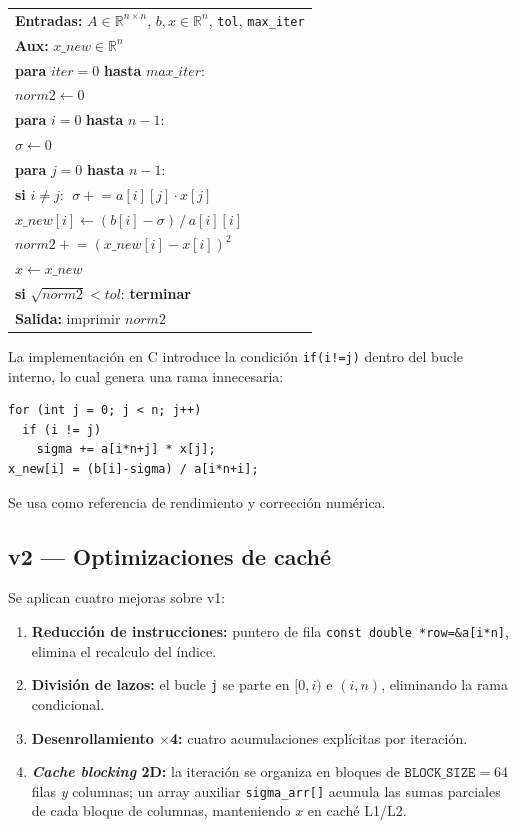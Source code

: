 \documentclass[a4paper,twocolumn]{article}
\begin{document}
\begin{center}
\small
\begin{tabular}{l}
\hline
\textbf{Entradas:} $A\in\mathbb{R}^{n\times n}$, $b,x\in\mathbb{R}^n$,
  \texttt{tol}, \texttt{max\_iter}\\
\textbf{Aux:} $x\_new\in\mathbb{R}^n$\\
\hline
\textbf{para} $\mathit{iter}=0$ \textbf{hasta} $\mathit{max\_iter}$:\\
\quad $\mathit{norm2} \leftarrow 0$\\
\quad \textbf{para} $i=0$ \textbf{hasta} $n-1$:\\
\quad\quad $\sigma \leftarrow 0$\\
\quad\quad \textbf{para} $j=0$ \textbf{hasta} $n-1$:\\
\quad\quad\quad \textbf{si} $i \neq j$: $\;\sigma \mathrel{+}= a[i][j]\cdot x[j]$\\
\quad\quad $x\_new[i] \leftarrow (b[i]-\sigma)\,/\,a[i][i]$\\
\quad\quad $\mathit{norm2} \mathrel{+}= (x\_new[i]-x[i])^2$\\
\quad $x \leftarrow x\_new$\\
\quad \textbf{si} $\sqrt{\mathit{norm2}} < \mathit{tol}$: \textbf{terminar}\\
\textbf{Salida:} imprimir $\mathit{norm2}$\\
\hline
\end{tabular}
\end{center}

La implementación en C introduce la condición \texttt{if(i!=j)}
dentro del bucle interno, lo cual genera una rama innecesaria:

\begin{lstlisting}
for (int j = 0; j < n; j++)
  if (i != j)
    sigma += a[i*n+j] * x[j];
x_new[i] = (b[i]-sigma) / a[i*n+i];
\end{lstlisting}

Se usa como referencia de rendimiento y corrección numérica.

\subsection{v2 --- Optimizaciones de caché}

Se aplican cuatro mejoras sobre v1:

\begin{enumerate}
  \item \textbf{Reducción de instrucciones:} puntero de fila
        \texttt{const double *row=\&a[i*n]}, elimina el recalculo del índice.
  \item \textbf{División de lazos:} el bucle \texttt{j} se parte en
        $[0,i)$ e $(i,n)$, eliminando la rama condicional.
  \item \textbf{Desenrollamiento $\times$4:} cuatro acumulaciones explícitas
        por iteración.
  \item \textbf{\textit{Cache blocking} 2D:} la iteración se organiza en
        bloques de $\texttt{BLOCK\_SIZE}{=}64$ filas \emph{y} columnas; un
        array auxiliar \texttt{sigma\_arr[]} acumula las sumas parciales de
        cada bloque de columnas, manteniendo $x$ en caché L1/L2.
\end{enumerate}
\end{document}
